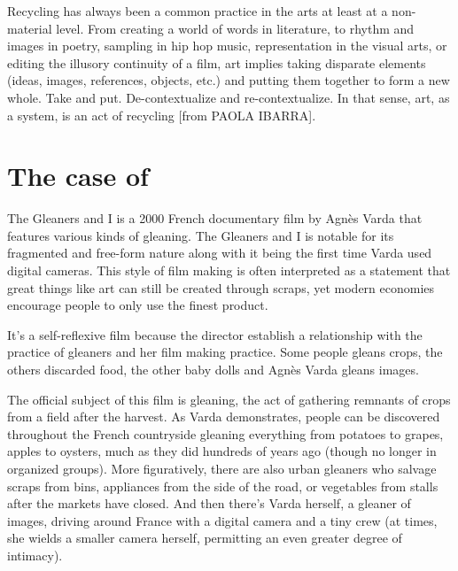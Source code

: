 Recycling has always been a common practice in the arts at least at a non-material level. From creating a world of words in literature, to rhythm and images in poetry, sampling in hip hop music, representation in the visual arts, or editing the illusory continuity of a film, art implies taking disparate elements (ideas, images, references, objects, etc.) and putting them together to form a new whole. Take and put. De-contextualize and re-contextualize. In that sense, art, as a system, is an act of recycling [from PAOLA IBARRA].


\section{The case of }
The Gleaners and I is a 2000 French documentary film by Agnès Varda that features various kinds of gleaning. The Gleaners and I is notable for its fragmented and free-form nature along with it being the first time Varda used digital cameras. This style of film making is often interpreted as a statement that great things like art can still be created through scraps, yet modern economies encourage people to only use the finest product.

It's a self-reflexive film because the director establish a relationship with the practice of gleaners and her film making practice. Some people gleans crops, the others discarded food, the other baby dolls and Agnès Varda gleans images.  


The official subject of this film is gleaning, the act of gathering remnants of crops from a field after the harvest. As Varda demonstrates, people can be discovered throughout the French countryside gleaning everything from potatoes to grapes, apples to oysters, much as they did hundreds of years ago (though no longer in organized groups). More figuratively, there are also urban gleaners who salvage scraps from bins, appliances from the side of the road, or vegetables from stalls after the markets have closed. And then there’s Varda herself, a gleaner of images, driving around France with a digital camera and a tiny crew (at times, she wields a smaller camera herself, permitting an even greater degree of intimacy).

